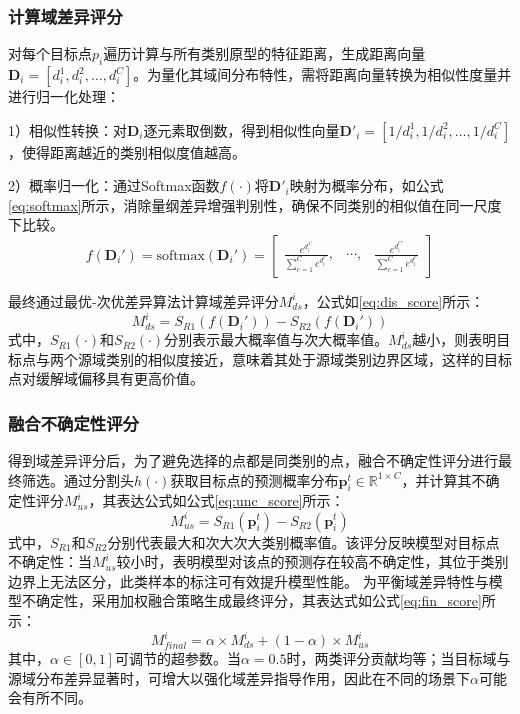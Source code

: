 \subsubsection{计算域差异评分}
对每个目标点\(p_i\)遍历计算与所有类别原型的特征距离，生成距离向量\( \mathbf{D}_i = [d_i^1, d_i^2, \dots, d_i^C] \)。为量化其域间分布特性，需将距离向量转换为相似性度量并进行归一化处理：

1）相似性转换：对\( \mathbf{D}_i\)逐元素取倒数，得到相似性向量\( \mathbf{D'}_i = [1/d_i^1, 1/d_i^2, \dots, 1/d_i^C] \)，使得距离越近的类别相似度值越高。

2）概率归一化：通过Softmax函数\(f(\cdot)\)将\(\mathbf{D'}_i\)映射为概率分布，如公式\eqref{eq:softmax}所示，消除量纲差异增强判别性，确保不同类别的相似值在同一尺度下比较。
\begin{equation}
    \label{eq:softmax}
    f(\mathbf{D}_i') = \text{softmax}(\mathbf{D}_i') = 
    \begin{bmatrix}
    \displaystyle
    \frac{e^{d_i^{1'}}}{\sum_{c=1}^{C} e^{d_i^{c'}}}, &
    \cdots, &
    \displaystyle
    \frac{e^{d_i^{C'}}}{\sum_{c=1}^{C} e^{d_i^{c'}}}
    \end{bmatrix}
\end{equation}

最终通过最优-次优差异算法计算域差异评分\(M^i_{ds}\)，公式如\eqref{eq:dis_score}所示：
\begin{equation}
    \label{eq:dis_score}
    M^i_{ds} = S_{R1}(f(\mathbf{D}_i')) - S_{R2}(f(\mathbf{D}_i'))
\end{equation}
式中，\(S_{R1}(\cdot)\)和\(S_{R2}(\cdot)\)分别表示最大概率值与次大概率值。\(M^i_{ds}\)越小，则表明目标点与两个源域类别的相似度接近，意味着其处于源域类别边界区域，这样的目标点对缓解域偏移具有更高价值。

\subsubsection{融合不确定性评分}
得到域差异评分后，为了避免选择的点都是同类别的点，融合不确定性评分进行最终筛选。通过分割头\(h(\cdot)\)获取目标点的预测概率分布\(\mathbf{p}^t_i \in \mathbb{R}^{1\times C}\)，并计算其不确定性评分\( M^i_{us} \)，其表达公式如公式\eqref{eq:unc_score}所示：
\begin{equation}
    \label{eq:unc_score}
    M^i_{us} = S_{R1}(\mathbf{p}_i^t) - S_{R2}(\mathbf{p}_i^t)
\end{equation}
式中，$S_{R1}$和$S_{R2}$分别代表最大和次大次大类别概率值。该评分反映模型对目标点不确定性：当\(M^i_{us}\)较小时，表明模型对该点的预测存在较高不确定性，其位于类别边界上无法区分，此类样本的标注可有效提升模型性能。
为平衡域差异特性与模型不确定性，采用加权融合策略生成最终评分，其表达式如公式\eqref{eq:fin_score}所示：
\begin{equation}
    \label{eq:fin_score}
    M^i_{final} = \alpha \times M^i_{ds} + (1 - \alpha) \times M^i_{us}
\end{equation}
其中，\(\alpha \in [0,1]\)可调节的超参数。当\(\alpha=0.5\)时，两类评分贡献均等；当目标域与源域分布差异显著时，可增大以强化域差异指导作用，因此在不同的场景下\(\alpha\)可能会有所不同。

